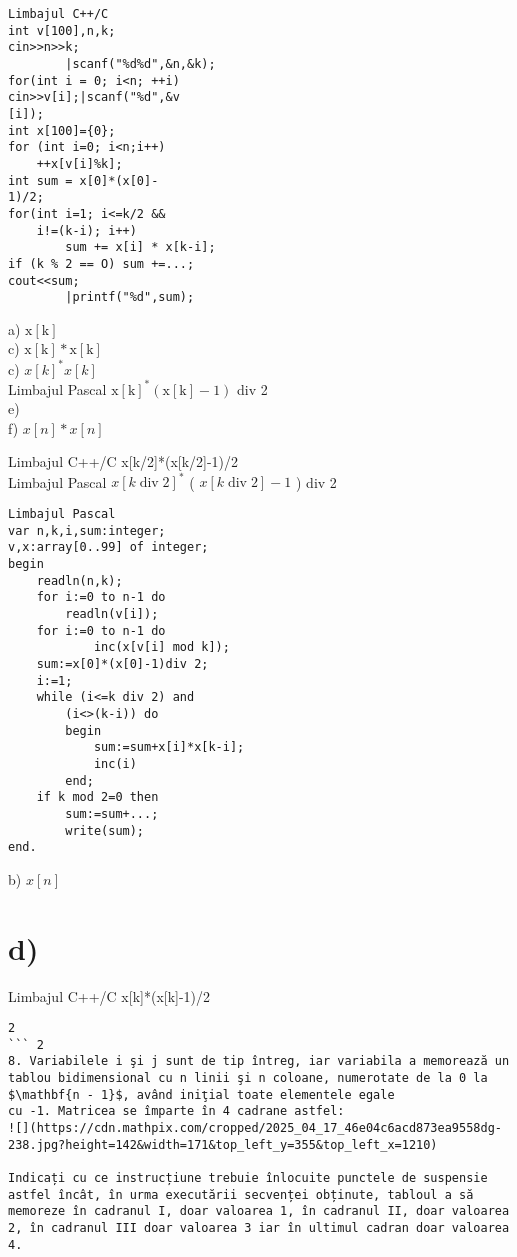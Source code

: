 \begin{verbatim}
Limbajul C++/C
int v[100],n,k;
cin>>n>>k;
        |scanf("%d%d",&n,&k);
for(int i = 0; i<n; ++i)
cin>>v[i];|scanf("%d",&v
[i]);
int x[100]={0};
for (int i=0; i<n;i++)
    ++x[v[i]%k];
int sum = x[0]*(x[0]-
1)/2;
for(int i=1; i<=k/2 &&
    i!=(k-i); i++)
        sum += x[i] * x[k-i];
if (k % 2 == O) sum +=...;
cout<<sum;
        |printf("%d",sum);
\end{verbatim}

a) $\mathrm{x}[\mathrm{k}]$\\
c) $\mathrm{x}[\mathrm{k}] * \mathrm{x}[\mathrm{k}]$\\
c) $x[k]^{*} x[k]$\\
Limbajul Pascal $\mathrm{x}[\mathrm{k}]^{*}(\mathrm{x}[\mathrm{k}]-1)$ div 2\\
e)\\
f) $x[n] * x[n]$

Limbajul C++/C x[k/2]*(x[k/2]-1)/2\\
Limbajul Pascal $x[k \operatorname{div} 2]^{*}$ ( $x[k \operatorname{div} 2]-1$ ) div 2

\begin{verbatim}
Limbajul Pascal
var n,k,i,sum:integer;
v,x:array[0..99] of integer;
begin
    readln(n,k);
    for i:=0 to n-1 do
        readln(v[i]);
    for i:=0 to n-1 do
            inc(x[v[i] mod k]);
    sum:=x[0]*(x[0]-1)div 2;
    i:=1;
    while (i<=k div 2) and
        (i<>(k-i)) do
        begin
            sum:=sum+x[i]*x[k-i];
            inc(i)
        end;
    if k mod 2=0 then
        sum:=sum+...;
        write(sum);
end.
\end{verbatim}

b) $x[n]$

\section*{d)}
Limbajul C++/C x[k]*(x[k]-1)/2\\
$\qquad$

\begin{verbatim}
2
``` 2
8. Variabilele i şi j sunt de tip întreg, iar variabila a memorează un tablou bidimensional cu n linii şi n coloane, numerotate de la 0 la $\mathbf{n - 1}$, având iniţial toate elementele egale
cu -1. Matricea se împarte în 4 cadrane astfel:
![](https://cdn.mathpix.com/cropped/2025_04_17_46e04c6acd873ea9558dg-238.jpg?height=142&width=171&top_left_y=355&top_left_x=1210)

Indicați cu ce instrucțiune trebuie înlocuite punctele de suspensie astfel încât, în urma executării secvenței obținute, tabloul a să memoreze în cadranul I, doar valoarea 1, în cadranul II, doar valoarea 2, în cadranul III doar valoarea 3 iar în ultimul cadran doar valoarea 4.
\end{verbatim}

